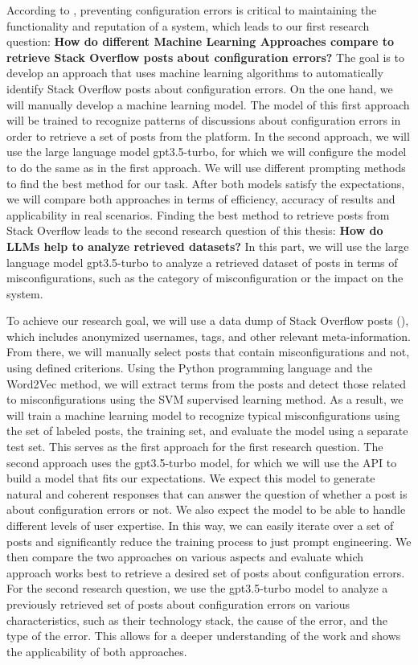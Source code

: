 \documentclass[english,bachelor]{swsLeipzig}
\begin{document}
According to \citet{yinma:2011}, preventing configuration errors is critical to maintaining the 
functionality and reputation of a system, which leads to our first research question: \textbf{How do different Machine 
Learning Approaches compare to retrieve Stack Overflow posts about configuration errors?} The goal is to develop 
an approach that uses machine learning algorithms to automatically identify Stack Overflow posts about 
configuration errors. On the one hand, we will manually develop a machine learning model. The model of this 
first approach will be trained to recognize patterns of discussions about configuration errors in order to 
retrieve a set of posts from the platform. In the second approach, we will use the large language model gpt3.5-turbo, for which we will configure the model to do the same as in the first approach. We will use different 
prompting methods to find the best method for our task. After both models satisfy the expectations, we will 
compare both approaches in terms of efficiency, accuracy of results and applicability in real scenarios. Finding 
the best method to retrieve posts from Stack Overflow leads to the second research question of this thesis: 
\textbf{How do LLMs help to analyze retrieved datasets?} In this part, we will use the large language model gpt3.5-turbo to analyze a retrieved dataset 
of posts in terms of misconfigurations, such as the category of misconfiguration or the impact on the system.

To achieve our research goal, we will use a data dump of Stack Overflow posts (\citet{stackexchange:2023}), which includes anonymized 
usernames, tags, and other relevant meta-information. From there, we will manually select posts that contain 
misconfigurations and not, using defined criterions. Using the Python programming language and the Word2Vec 
method, we will extract terms from the posts and detect those related to misconfigurations using the SVM 
supervised learning method. As a result, we will train a machine learning model to recognize typical 
misconfigurations using the set of labeled posts, the training set, and evaluate the model using a separate 
test set. This serves as the first approach for the first research question. The second approach uses the 
gpt3.5-turbo model, for which we will use the API to build a model that fits our expectations. 
We expect this model to generate natural and coherent responses that can answer the question of whether a post 
is about configuration errors or not. We also expect the model to be able to handle different levels of user 
expertise. In this way, we can easily iterate over a set of posts and significantly reduce the training process 
to just prompt engineering. We then compare the two approaches on various aspects and evaluate which approach 
works best to retrieve a desired set of posts about configuration errors. For the second research question, 
we use the gpt3.5-turbo model to analyze a previously retrieved set of posts about configuration errors on various 
characteristics, such as their technology stack, the cause of the error, and  the type of the error. This allows 
for a deeper understanding of the work and shows the applicability of both approaches.
\end{document}
